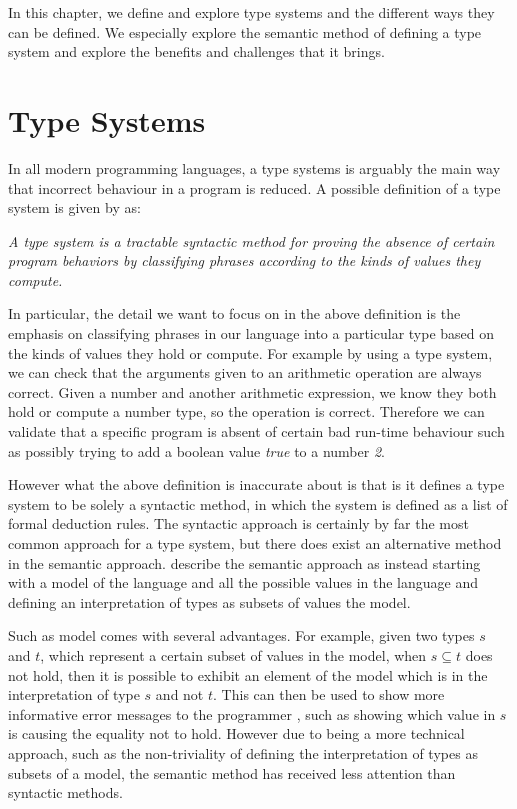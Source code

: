 \documentclass{l4proj}
\begin{document}
In this chapter, we define and explore type systems and the different ways they can be defined. We especially explore the semantic method of defining a type system and explore the benefits and challenges that it brings.

\section{Type Systems}

In all modern programming languages, a type systems is arguably the main way that incorrect behaviour in a program is reduced.
A possible definition of a type system is given by \citet{Pierce2002} as:

\emph{A type system is a tractable syntactic method for proving the absence of certain program behaviors by classifying phrases according to the kinds of values they compute.}

In particular, the detail we want to focus on in the above definition is the emphasis on classifying phrases in our language into a particular type based on the kinds of values they hold or compute.
For example by using a type system, we can check that the arguments given to an arithmetic operation are always correct.
Given a number and another arithmetic expression, we know they both hold or compute a number type, so the operation is correct.
Therefore we can validate that a specific program is absent of certain bad run-time behaviour such as possibly trying to add a boolean value \emph{true} to a number \emph{2}.

However what the above definition is inaccurate about is that is it defines a type system to be solely a syntactic method, in which the system is defined as a list of formal deduction rules.
The syntactic approach is certainly by far the most common approach for a type system, but there does exist an alternative method in the semantic approach.
\citet{Frisch2002} describe the semantic approach as instead starting with a model of the language and all the possible values in the language and defining an interpretation of types as subsets of values the model.

Such as model comes with several advantages.
For example, given two types $s$ and $t$, which represent a certain subset of values in the model, when $s \subseteq t$ does not hold, then it is possible to exhibit an element of the model which is in the interpretation of type $s$ and not $t$.
This can then be used to show more informative error messages to the programmer \citep{Castagna2005}, such as showing which value in $s$ is causing the equality not to hold.
However due to being a more technical approach, such as the non-triviality of defining the interpretation of types as subsets of a model, the semantic method has received less attention than syntactic methods.
\end{document}
